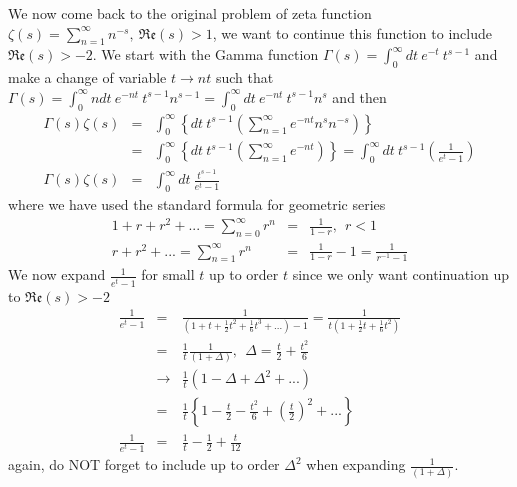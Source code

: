 \documentclass[aps,preprint,preprintnumbers,nofootinbib,showpacs,prd]{revtex4-1}
\newcommand{\nbea}{\begin{eqnarray*}}
\newcommand{\neea}{\end{eqnarray*}}
\begin{document}
We now come back to the original problem of zeta function $\zeta(s) = \sum\limits_{n=1}^{\infty} n^{-s},~\mathfrak{Re}(s) > 1$, we want to continue this function to include $\mathfrak{Re}(s) > -2$. We start with the Gamma function $\Gamma(s) = \int_0^\infty dt ~e^{-t} ~ t^{s-1}$ and make a change of variable $t \rightarrow nt$ such that $\Gamma(s) = \int_0^\infty n dt~e^{-nt} ~ t^{s-1} n^{s-1} = \int_0^\infty dt~e^{-nt} ~ t^{s-1} n^{s}$ and then
%
\nbea
\Gamma(s)\zeta(s) & = & \int_0^\infty \left \{ dt~ t^{s-1} \left ( \sum\limits_{n=1}^{\infty}e^{-nt}  n^{s} n^{-s} \right ) \right \} \\
& = & \int_0^\infty \left \{ dt~ t^{s-1} \left ( \sum\limits_{n=1}^{\infty}e^{-nt} \right ) \right \} = \int_0^\infty dt~ t^{s-1} \left ( \frac{1}{e^t - 1} \right ) \\
\Gamma(s)\zeta(s) & = & \int_0^\infty dt~ \frac{t^{s-1}}{e^t - 1}
\neea
%
where we have used the standard formula for geometric series
%
\nbea
1 + r + r^2 + ... = \sum_{n=0}^{\infty} r^n & = & \frac{1}{1 - r}, ~~r < 1 \\
r + r^2 + ... = \sum_{n=1}^{\infty} r^n & = & \frac{1}{1 - r} - 1 = \frac{1}{r^{-1} - 1}
\neea
%
We now expand $\frac{1}{e^t - 1}$ for small $t$ up to order $t$ since we only want continuation up to $\mathfrak{Re}(s) > -2$
%
\nbea
\frac{1}{e^t - 1} & = & \frac{1}{(1 + t + \frac{1}{2}t^2 + \frac{1}{6}t^3 + ...) - 1} = \frac{1}{t(1 + \frac{1}{2}t + \frac{1}{6}t^2)} \\
& = & \frac{1}{t}\frac{1}{(1 + \Delta)}, ~~ \Delta = \frac{t}{2} + \frac{t^2}{6} \\
& \rightarrow & \frac{1}{t} (1 - \Delta + \Delta^2 + ...) \\
& = & \frac{1}{t} \left \{ 1 - \frac{t}{2} - \frac{t^2}{6} + \left ( \frac{t}{2}\right ) ^2 + ... \right \} \\
\frac{1}{e^t - 1} & = & \frac{1}{t} - \frac{1}{2} + \frac{t}{12}
\neea
%
again, do NOT forget to include up to order $\Delta^2$ when expanding $\frac{1}{(1 + \Delta)}$.
\end{document}
